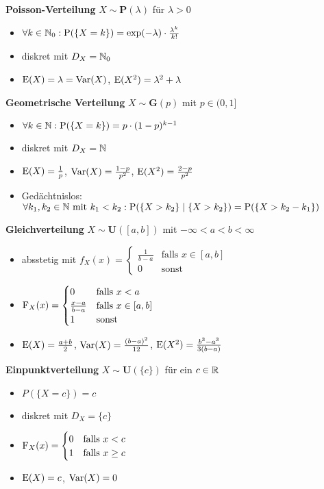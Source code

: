 \textbf{Poisson-Verteilung} $X\sim\mathbf{P}(\lambda)$ für $\lambda>0$
\begin{itemize}
\item $\forall k\in\mathbb{N}_0:\operatorname{P}(\{X=k\})=\exp(-\lambda)\cdot\frac{\lambda^k}{k!}$

\item diskret mit $D_X=\mathbb{N}_0$

\item $\operatorname{E}(X)=\lambda=\operatorname{Var}(X)$, $\operatorname{E}(X^2)=\lambda^2+\lambda$
\end{itemize}

\textbf{Geometrische Verteilung} $X\sim\mathbf{G}(p)$ mit $p\in(0,1]$
\begin{itemize}
\item $\forall k\in\mathbb{N}:\operatorname{P}(\{X=k\})=p\cdot(1-p)^{k-1}$

\item diskret mit $D_X=\mathbb{N}$

\item $\operatorname{E}(X)=\frac{1}{p}$, $\operatorname{Var}(X)=\frac{1-p}{p^2}$, $\operatorname{E}(X^2)=\frac{2-p}{p^2}$

\item Gedächtnislos: $\forall k_1,k_2\in\mathbb{N} \text{ mit } k_1<k_2:
\operatorname{P}(\{X>k_2\}\mid \{ X>k_2\}) = \operatorname{P}(\{X>k_2-k_1\})$\\
\end{itemize}

\textbf{Gleichverteilung} $X\sim\mathbf{U}([a,b])$ mit $-\infty<a<b<\infty$
\begin{itemize}
\item absstetig mit 
$f_X(x)=\begin{cases}
\frac{1}{b-a} 	& \text{falls } x\in [a,b]	\\
0				& \text{sonst }		
\end{cases}$

\item
$\operatorname{F}_X(x)=\begin{cases}
0 				& \text{falls } x<a			\\
\frac{x-a}{b-a}	& \text{falls } x\in [a,b]	\\
1				& \text{sonst}
\end{cases}$

\item $\operatorname{E}(X)=\frac{a+b}{2}$, $\operatorname{Var}(X)=\frac{(b-a)^2}{12}$,
$\operatorname{E}(X^2)=\frac{b^3-a^3}{3(b-a)}$
\end{itemize}

\textbf{Einpunktverteilung} $X\sim\mathbf{U}(\{c\})$ für ein $c\in\mathbb{R}$
\begin{itemize}
\item $P(\{X=c\})=c$

\item diskret mit $D_X=\{c\}$

\item $\operatorname{F}_X(x)=\begin{cases}
0 	&\text{falls } x<c			\\
1	& \text{falls } x\geq c
\end{cases}$

\item $\operatorname{E}(X)=c$, $\operatorname{Var}(X)=0$
\end{itemize}

